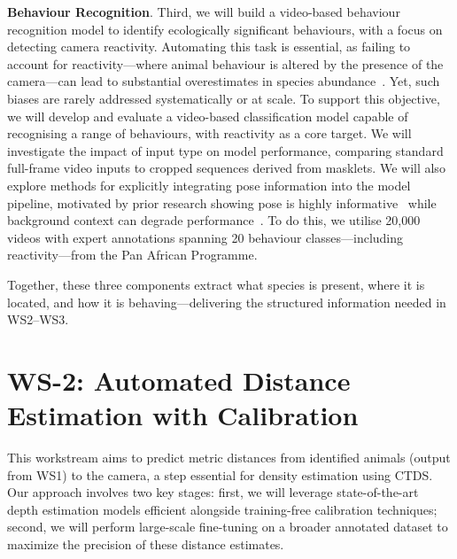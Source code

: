 \documentclass{article}
\begin{document}
\textbf{Behaviour Recognition}. Third, we will build a video-based behaviour recognition model to identify ecologically significant behaviours, with a focus on detecting camera reactivity. Automating this task is essential, as failing to account for reactivity—where animal behaviour is altered by the presence of the camera—can lead to substantial overestimates in species abundance~\cite{}. Yet, such biases are rarely addressed systematically or at scale. To support this objective, we will develop and evaluate a video-based classification model capable of recognising a range of behaviours, with reactivity as a core target. We will investigate the impact of input type on model performance, comparing standard full-frame video inputs to cropped sequences derived from masklets. We will also explore methods for explicitly integrating pose information into the model pipeline, motivated by prior research showing pose is highly informative~\cite{} while background context can degrade performance~\cite{}. To do this, we utilise 20,000 videos with expert annotations spanning 20 behaviour classes—including reactivity—from the Pan African Programme.

Together, these three components extract what species is present, where it is located, and how it is behaving—delivering the structured information needed in WS2–WS3.

\section*{WS-2: Automated Distance Estimation with Calibration}

This workstream aims to predict metric distances from identified animals (output from WS1) to the camera, a step essential for density estimation using CTDS. Our approach involves two key stages: first, we will leverage state-of-the-art depth estimation models efficient alongside training-free calibration techniques; second, we will perform large-scale fine-tuning on a broader annotated dataset to maximize the precision of these distance estimates.
\end{document}
